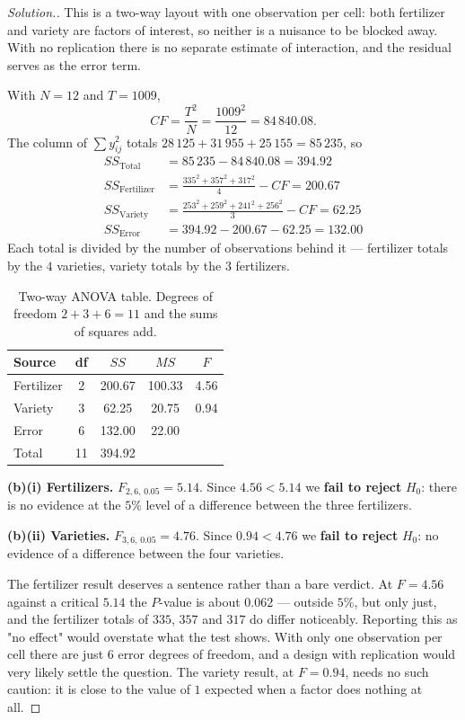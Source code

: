 \documentclass[11pt,a4paper]{article}
\theoremstyle{definition}
\newenvironment{solution}
  {\renewcommand{\qedsymbol}{}\begin{proof}[\textit{Solution}.]}
  {\end{proof}}
\begin{document}
\begin{solution}
This is a two-way layout with one observation per cell: both fertilizer and variety are
factors of interest, so neither is a nuisance to be blocked away. With no replication there
is no separate estimate of interaction, and the residual serves as the error term.

With $N=12$ and $T=1009$,
\[CF=\frac{T^2}{N}=\frac{1009^2}{12}=84\,840.08.\]
The column of $\sum y_{ij}^2$ totals $28\,125+31\,955+25\,155=85\,235$, so
\begin{align*}
SS_{\text{Total}} &=85\,235-84\,840.08=394.92\\
SS_{\text{Fertilizer}} &=\frac{335^2+357^2+317^2}{4}-CF=200.67\\
SS_{\text{Variety}} &=\frac{253^2+259^2+241^2+256^2}{3}-CF=62.25\\
SS_{\text{Error}} &=394.92-200.67-62.25=132.00
\end{align*}
Each total is divided by the number of observations behind it --- fertilizer totals by the
$4$ varieties, variety totals by the $3$ fertilizers.

\begin{table}[H]
\centering
\begin{tabular}{|l|c|c|c|c|}
\hline
Source & df & $SS$ & $MS$ & $F$\\
\hline
Fertilizer & 2 & 200.67 & 100.33 & 4.56\\
Variety & 3 & 62.25 & 20.75 & 0.94\\
Error & 6 & 132.00 & 22.00 & \\
\hline
Total & 11 & 394.92 & & \\
\hline
\end{tabular}
\caption{Two-way ANOVA table. Degrees of freedom $2+3+6=11$ and the sums of squares add.}
\end{table}

\textbf{(b)(i) Fertilizers.} $F_{2,6,\,0.05}=5.14$. Since $4.56<5.14$ we \textbf{fail to
reject} $H_0$: there is no evidence at the $5\%$ level of a difference between the three
fertilizers.

\textbf{(b)(ii) Varieties.} $F_{3,6,\,0.05}=4.76$. Since $0.94<4.76$ we \textbf{fail to
reject} $H_0$: no evidence of a difference between the four varieties.

The fertilizer result deserves a sentence rather than a bare verdict. At $F=4.56$ against a
critical $5.14$ the $P$-value is about $0.062$ --- outside $5\%$, but only just, and the
fertilizer totals of $335$, $357$ and $317$ do differ noticeably. Reporting this as "no
effect" would overstate what the test shows. With only one observation per cell there are
just $6$ error degrees of freedom, and a design with replication would very likely settle the
question. The variety result, at $F=0.94$, needs no such caution: it is close to the value of
$1$ expected when a factor does nothing at all.
\end{solution}
\end{document}
